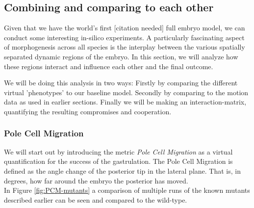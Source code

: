 


\subsection{Combining and comparing to each other}


Given that we have the world’s first [citation needed] full embryo model, we can conduct some interesting in-silico experiments. A particularly fascinating aspect of morphogenesis across all species is the interplay between the various spatially separated dynamic regions of the embryo. In this section, we will analyze how these regions interact and influence each other and the final outcome.

We will be doing this analysis in two ways: Firstly by comparing the different virtual 'phenotypes' to our baseline model. Secondly by comparing to the motion data as used in earlier sections. Finally we will be making an interaction-matrix, quantifying the resulting compromises and cooperation.  
\subsubsection{Pole Cell Migration}
We will start out by introducing the metric \textit{Pole Cell Migration} as a virtual quantification for the success of the gastrulation. The Pole Cell Migration is defined as the angle change of the posterior tip in the lateral plane. That is, in degrees, how far around the embryo the posterior has moved.\\



In Figure \ref{fig:PCM-mutants} a comparison of multiple runs of the known mutants described earlier can be seen and compared to the wild-type.

